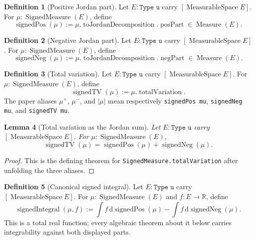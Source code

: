 \documentclass[9pt]{extarticle}
\newtheorem{lemma}{Lemma}[section]
\theoremstyle{definition}
\newtheorem{definition}[lemma]{Definition}
\theoremstyle{remark}
\newcommand{\R}{\mathbb R}
\newcommand{\dd}{\,\mathrm d}
\newcommand{\abs}[1]{\left\lvert #1\right\rvert}
\begin{document}
\begin{definition}[Positive Jordan part]
\label{def:fnd-signed-pos}
Let $E:\texttt{Type u}$ carry $[\operatorname{MeasurableSpace}E]$.
For $\mu:\operatorname{SignedMeasure}(E)$, define
\[
 \operatorname{signedPos}(\mu):=
 \mu.\operatorname{toJordanDecomposition}.\operatorname{posPart}
 \in\operatorname{Measure}(E).
\]
\end{definition}

\begin{definition}[Negative Jordan part]
\label{def:fnd-signed-neg}
Let $E:\texttt{Type u}$ carry $[\operatorname{MeasurableSpace}E]$.
For $\mu:\operatorname{SignedMeasure}(E)$, define
\[
 \operatorname{signedNeg}(\mu):=
 \mu.\operatorname{toJordanDecomposition}.\operatorname{negPart}
 \in\operatorname{Measure}(E).
\]
\end{definition}

\begin{definition}[Total variation]
\label{def:fnd-signed-tv}
Let $E:\texttt{Type u}$ carry $[\operatorname{MeasurableSpace}E]$.
For $\mu:\operatorname{SignedMeasure}(E)$, define
\[
 \operatorname{signedTV}(\mu):=\mu.\operatorname{totalVariation}.
\]
The paper aliases $\mu^+$, $\mu^-$, and $\abs\mu$ mean respectively
\texttt{signedPos mu}, \texttt{signedNeg mu}, and \texttt{signedTV mu}.
\end{definition}

\begin{lemma}[Total variation as the Jordan sum]
\label{lem:fnd-signed-tv-jordan}
Let $E:\texttt{Type u}$ carry $[\operatorname{MeasurableSpace}E]$.
For $\mu:\operatorname{SignedMeasure}(E)$,
\[
 \operatorname{signedTV}(\mu)=
 \operatorname{signedPos}(\mu)+\operatorname{signedNeg}(\mu).
\]
\end{lemma}

\begin{proof}
This is the defining theorem for
\texttt{SignedMeasure.totalVariation} after unfolding the three aliases.
\end{proof}

\begin{definition}[Canonical signed integral]
\label{eq:foundation-signed-integral}
Let $E:\texttt{Type u}$ carry $[\operatorname{MeasurableSpace}E]$.
For $\mu:\operatorname{SignedMeasure}(E)$ and $f:E\to\R$, define
\[
 \operatorname{signedIntegral}(\mu,f):=
 \int f\dd\operatorname{signedPos}(\mu)
 -\int f\dd\operatorname{signedNeg}(\mu).
\]
This is a total real function; every algebraic theorem about it below carries
integrability against both displayed parts.
\end{definition}
\end{document}
